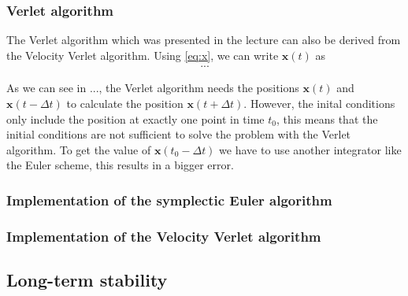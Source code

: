 \documentclass[a4paper,10pt,bibtotoc]{scrartcl}
\begin{document}
\subsubsection{Verlet algorithm}
The Verlet algorithm which was presented in the lecture can also be derived from the Velocity Verlet algorithm. Using \autoref{eq:x}, we can write $\mathbf{x}(t)$ as
\begin{align}
... 
\end{align}


As we can see in ..., the Verlet algorithm needs the positions $\mathbf{x}(t)$ and $\mathbf{x}(t-\Delta t)$ to calculate the position $\mathbf{x}(t+\Delta t)$. However, the inital conditions only include the position at exactly one point in time $t_0$, this means that the initial conditions are not sufficient to solve the problem with the Verlet algorithm. To get the value of $\mathbf{x}(t_0-\Delta t)$ we have to use another integrator like the Euler scheme, this results in a bigger error. 

\subsubsection{Implementation of the symplectic Euler algorithm}

\subsubsection{Implementation of the Velocity Verlet algorithm}


\subsection{Long-term stability}
\end{document}
